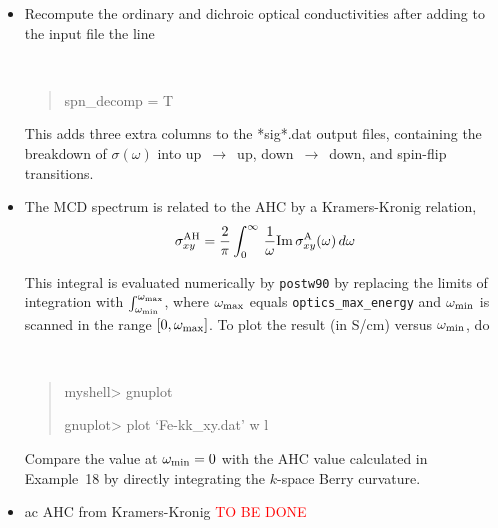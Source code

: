 \documentclass[a4paper,11pt,twoside]{article}
\begin{document}
\begin{itemize}

\item Recompute the ordinary and dichroic optical conductivities after
  adding to the input file the line
%
{\tt
\begin{quote}

spn\_decomp = T
\end{quote} }
%
This adds three extra columns to the *sig*.dat output files,
containing the breakdown of $\sigma(\omega)$ into
up~$\rightarrow$~up, down~$\rightarrow$~down, and spin-flip
transitions.

\item The MCD spectrum is related to the AHC by a Kramers-Kronig
relation,
%
$$
\sigma^{\rm AH}_{xy}=\frac{2}{\pi}\int_0^\infty\,
\frac{1}{\omega}{\rm Im}\,\sigma^{\rm A}_{xy}(\omega)\,d\omega
$$

This integral is evaluated numerically by {\tt postw90} by replacing
the limits of integration with $\int_{\omega_{\rm min}}^{\omega_{\rm
    max}}$, where $\omega_{\rm max}$ equals {\tt optics\_max\_energy}
and $\omega_{\rm min}$ is scanned in the range $[0,\omega_{\rm
  max}]$. To plot the result (in S/cm) versus $\omega_{\rm min}$, do
%
{\tt
\begin{quote} myshell> gnuplot

gnuplot> plot `Fe-kk\_xy.dat' w l
\end{quote} }
%
Compare the value at $\omega_{\rm min}=0$ with the AHC value
calculated in Example~18 by directly integrating the $k$-space Berry
curvature.

\item ac AHC from Kramers-Kronig \textcolor{red}{TO BE DONE}

\end{itemize}

\cleardoublepage
\end{document}
